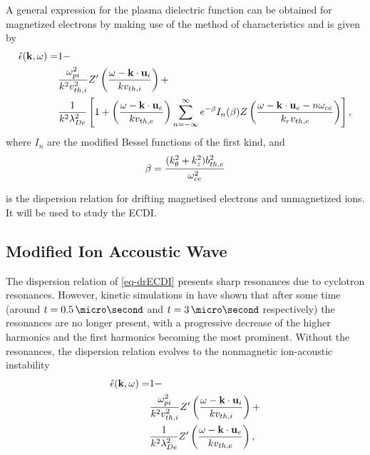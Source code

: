     \vspace{1em}
    A general expression for the plasma dielectric function can be obtained for magnetized electrons by making use of the method of characteristics and is given by
    \begin{equation} \label{eq-drECDI}
      \begin{split}
      \hat\epsilon({\mathbf k},\omega) =& 1 - \\
       &\frac{\omega_{pi}^2}{k^2 v^2_{th, i}} Z'\left( \frac{\omega - {\mathbf k} \cdot {\mathbf u_{i}}}{k v_{th, i}}  \right) + \\
       & \frac{1}{k^2 \lambda_{De}^2} \left[ 1 + \left(  \frac{\omega - {\mathbf k} \cdot {\mathbf u_{e}}}{k v_{th, e}} \right) \sum_{n=-\infty}^{\infty} e^{- \beta} I_n(\beta) Z\left(  \frac{\omega - {\mathbf k} \cdot {\mathbf u_{e} - n \ensuremath{\omega_{ce}}}}{k_{r} v_{th, e}} \right)  \right],
    \end{split}
    \end{equation}
    where $I_n$ are the modified Bessel functions of the first kind, and 
    \begin{equation} \label{eq-beta}
      \beta = \frac{(k_{\theta}^2 + k_z^2) b^2_{th, e}}{ \omega_{ce}^2}
    \end{equation}
    
     is the dispersion relation for drifting magnetised electrons and unmagnetized ions.
    It will be used to study the \acf{ECDI}.
    


  \subsection{Modified Ion Accoustic Wave}
    \label{sucsec-IAW}
    
    The dispersion relation of \cref{eq-drECDI} presents sharp resonances due to cyclotron resonances.
    However, kinetic simulations in \citet{janhunen2018,taccogna2019} have shown that after some time (around  $t=0.5\,\micro\second$ and $t=3\,\micro\second$ respectively) the resonances are no longer present, with a progressive decrease of the higher harmonics and the first harmonics becoming the most prominent.
    Without the resonances, the dispersion relation evolves to the nonmagnetic ion-acoustic instability
    \begin{equation} \label{eq-drIAWgene}
      \begin{split}
      \hat\epsilon({\mathbf k},\omega) =& 1 - \\
       &\frac{\omega_{pi}^2}{k^2 v^2_{th, i}} Z'\left( \frac{\omega - {\mathbf k} \cdot {\mathbf u_{i}}}{k v_{th, i}}  \right) + \\
       & \frac{1}{k^2 \lambda_{De}^2}  Z'\left(  \frac{\omega - {\mathbf k} \cdot {\mathbf u_{e}}}{k v_{th, e}} \right) ,
    \end{split}
    \end{equation}

